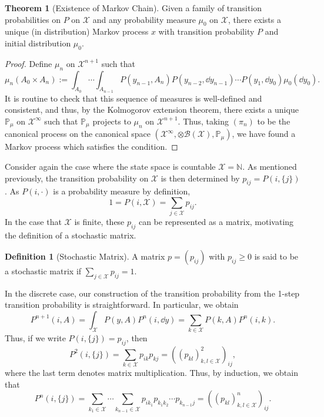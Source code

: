 \documentclass[]{article}
\theoremstyle{definition}
\newtheorem{theorem}{Theorem}
\theoremstyle{definition}
\newtheorem{definition}{Definition}[section]
\begin{document}
\begin{theorem}[Existence of Markov Chain]
  Given a family of transition probabilities on \(P\) on \(\mathcal{X}\) and any 
  probability measure \(\mu_0\) on \(\mathcal{X}\), there exists a unique (in distribution) 
  Markov process \(x\) with transition probability \(P\) and initial distribution 
  \(\mu_0\). 
\end{theorem}
\begin{proof}
  Define \(\mu_n\) on \(\mathcal{X}^{n + 1}\) such that 
  \[\mu_n(A_0 \times A_n) := \int_{A_0} \cdots \int_{A_{n - 1}} 
  P(y_{n - 1}, A_n) P(y_{n - 2}, \dd y_{n - 1}) \cdots P(y_1, \dd y_0) \mu_0(\dd y_0).\]
  It is routine to check that this sequence of measures is well-defined and consistent, and 
  thus, by the Kolmogorov extension theorem, there exists a unique \(\mathbb{P}_\mu\) on \(\mathcal{X}^\infty\) 
  such that \(\mathbb{P}_\mu\) projects to \(\mu_n\) on \(\mathcal{X}^{n + 1}\). Thus, 
  taking \((\pi_n)\) to be the canonical process on the canonical space 
  \((\mathcal{X}^\infty, \otimes \mathcal{B}(\mathcal{X}), \mathbb{P}_\mu)\), we have 
  found a Markov process which satisfies the condition.
\end{proof}

Consider again the case where the state space is countable \(\mathcal{X} = \mathbb{N}\). 
As mentioned previously, the transition probability on \(\mathcal{X}\) is then 
determined by \(p_{ij} = P(i, \{j\})\). As \(P(i, \cdot)\) is a probability 
measure by definition, 
\[1 = P(i, \mathcal{X}) = \sum_{j \in \mathcal{X}} p_{ij}.\]
In the case that \(\mathcal{X}\) is finite, these \(p_{ij}\) can be represented 
as a matrix, motivating the definition of a stochastic matrix.

\begin{definition}[Stochastic Matrix]
  A matrix \(p = (p_{ij})\) with \(p_{ij} \ge 0\) is said to be a stochastic 
  matrix if \(\sum_{j \in \mathcal{X}} p_{ij} = 1\).
\end{definition}

In the discrete case, our construction of the transition probability from 
the 1-step transition probability is straightforward. In particular, we obtain
\[P^{n + 1}(i, A) = \int_{\mathcal{X}} P(y, A) P^n(i, \dd y) = \sum_{k \in \mathcal{X}} P(k, A) P^n(i, k).\]
Thus, if we write \(P(i, \{j\}) = p_{ij}\), then
\[P^2(i, \{j\}) = \sum_{k \in \mathcal{X}} p_{ik}p_{kj} = ((p_{kl})_{k,l \in \mathcal{X}}^2)_{ij},\]
where the last term denotes matrix multiplication. Thus, by induction, we obtain that 
\[P^n(i, \{j\}) = \sum_{k_1 \in \mathcal{X}} \cdots \sum_{k_{n - 1} \in \mathcal{X}}
  p_{ik_1} p_{k_1k_2} \cdots p_{k_{n-1}j} = ((p_{kl})_{k,l \in \mathcal{X}}^n)_{ij}.\]
\end{document}

